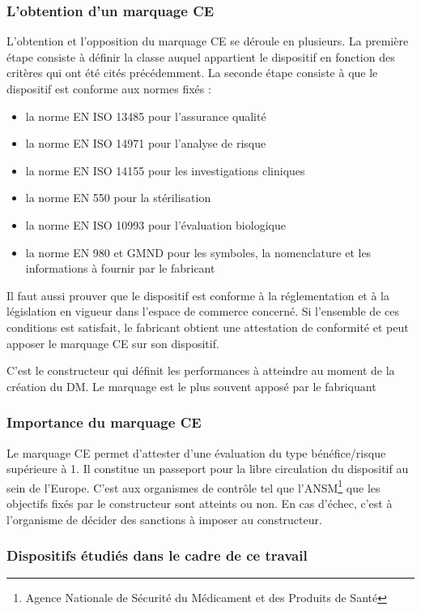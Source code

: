 \subsubsection{L'obtention d'un marquage CE}
L'obtention et l'opposition du marquage CE se déroule en plusieurs.
La première étape consiste à définir la classe auquel appartient le dispositif en fonction des critères qui ont été cités précédemment.
La seconde étape consiste à que le dispositif est conforme aux normes fixés : 
\begin{itemize}
\item la norme EN ISO 13485 pour l'assurance qualité
\item la norme EN ISO 14971 pour l'analyse de risque
\item la norme EN ISO 14155 pour les investigations cliniques
\item la norme EN 550 pour la stérilisation
\item la norme EN ISO 10993 pour l'évaluation biologique
\item la norme EN 980 et GMND pour les symboles, la nomenclature et les informations à fournir par le fabricant
\end{itemize}

Il faut aussi prouver que le dispositif est conforme à la réglementation et à la législation en vigueur dans l'espace de commerce concerné.
Si l'ensemble de ces conditions est satisfait, le fabricant obtient une attestation de conformité et peut apposer le marquage CE sur son dispositif.

C'est le constructeur qui définit les performances à atteindre au moment de la création du DM. Le marquage est le plus souvent apposé par le fabriquant

\subsubsection{Importance du marquage CE}

Le marquage CE permet d'attester d'une évaluation du type bénéfice/risque supérieure à 1. Il constitue un passeport pour la libre circulation du dispositif au sein de l'Europe. C'est aux organismes de contrôle tel que l'ANSM\footnote{Agence Nationale de Sécurité du Médicament et des Produits de Santé} que les objectifs fixés par le constructeur sont atteints ou non. En cas d'échec, c'est à l'organisme de décider des sanctions à imposer au constructeur.

\subsubsection{Dispositifs étudiés dans le cadre de ce travail}

